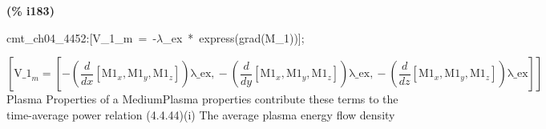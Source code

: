 \documentclass[fleqn]{article}
\begin{document}
\noindent
\begin{minipage}[t]{4.000000em}\color{red}\bfseries
(\% i183)	
\end{minipage}
\begin{minipage}[t]{\textwidth}\color{blue}
cmt\_ch04\_4452:[V\_1\_m\ =\ -\ensuremath{\lambda}\_ex\ *\ express(grad(M\_1))];
\end{minipage}
\[\displaystyle \tag{\% o183} 
\operatorname{[}{{\ensuremath{\mathrm{V\_ 1}}}_m}=\left[ -\left( \frac{d}{d x} \left[ {{\ensuremath{\mathrm{M1}}}_x}\operatorname{,}{{\ensuremath{\mathrm{M1}}}_y}\operatorname{,}{{\ensuremath{\mathrm{M1}}}_z}\right] \right)  \ensuremath{\mathrm{\lambda \_ ex}}\operatorname{,}-\left( \frac{d}{d y} \left[ {{\ensuremath{\mathrm{M1}}}_x}\operatorname{,}{{\ensuremath{\mathrm{M1}}}_y}\operatorname{,}{{\ensuremath{\mathrm{M1}}}_z}\right] \right)  \ensuremath{\mathrm{\lambda \_ ex}}\operatorname{,}-\left( \frac{d}{d z} \left[ {{\ensuremath{\mathrm{M1}}}_x}\operatorname{,}{{\ensuremath{\mathrm{M1}}}_y}\operatorname{,}{{\ensuremath{\mathrm{M1}}}_z}\right] \right)  \ensuremath{\mathrm{\lambda \_ ex}}\right] \operatorname{]}\mbox{}
\]
Plasma Properties of a MediumPlasma properties contribute these terms to the time-average power relation (4.4.44)(i) The average plasma energy flow density
\end{document}

